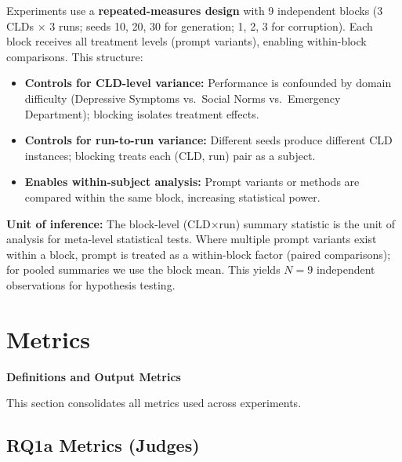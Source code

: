 Experiments use a \textbf{repeated-measures design} with 9 independent blocks (3 CLDs $\times$ 3 runs; seeds 10, 20, 30 for generation; 1, 2, 3 for corruption). Each block receives all treatment levels (prompt variants), enabling within-block comparisons. This structure:

\begin{itemize}[noitemsep]
    \item \textbf{Controls for CLD-level variance:} Performance is confounded by domain difficulty (Depressive Symptoms vs.\ Social Norms vs.\ Emergency Department); blocking isolates treatment effects.
    \item \textbf{Controls for run-to-run variance:} Different seeds produce different CLD instances; blocking treats each (CLD, run) pair as a subject.
    \item \textbf{Enables within-subject analysis:} Prompt variants or methods are compared within the same block, increasing statistical power.
\end{itemize}

\textbf{Unit of inference:} The block-level (CLD$\times$run) summary statistic is the unit of analysis for meta-level statistical tests. Where multiple prompt variants exist within a block, prompt is treated as a within-block factor (paired comparisons); for pooled summaries we use the block mean. This yields $N=9$ independent observations for hypothesis testing.

\section{Metrics}

\noindent\textbf{Definitions and Output Metrics}
\label{sec:metrics_definitions}

This section consolidates all metrics used across experiments.

\subsection{RQ1a Metrics (Judges)}
\label{sec:metrics_rq1a}

